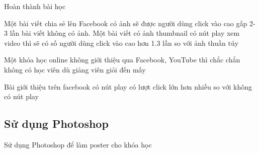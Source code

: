 Hoàn thành bài học

Một bài viết chia sẻ lên Facebook có ảnh sẽ được người dùng click vào cao gấp 2-3 lần bài viết không có ảnh.
Một bài viết có ảnh thumbnail có nút play xem video thì sẽ có số người dùng click vào cao hơn 1.3 lần so với ảnh thuần túy

Một khóa học online không giới thiệu qua Facebook, YouTube thì chắc chắn không có học viên dù giảng viên giỏi đến mấy

Bài giới thiệu trên facebook có nút play có lượt click lớn hơn nhiều so với không có nút play

\subsection{Sử dụng Photoshop}

Sử dụng Photoshop để làm poster cho khóa học